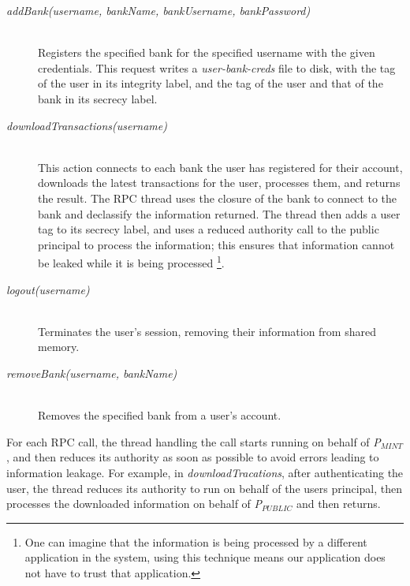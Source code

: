 \begin{description}
  \item[\emph{addBank(username, bankName, bankUsername, bankPassword)}] \ \\
    Registers the specified bank 
    for the specified username with the given 
    credentials.
    This request writes a \emph{user-bank-creds} 
    file to disk, with the tag of
    the user in its integrity label, and the 
    tag of the user and that of the bank
    in its secrecy label.
  \item[\emph{downloadTransactions(username)}] \ \\
    This action connects to each bank the 
    user has registered for their account, 
    downloads the latest transactions for the user, 
    processes them, and returns the result.
    The RPC thread uses the closure of the bank to
    connect to the bank and declassify the 
    information returned. The thread then
    adds a user tag to its secrecy label, 
    and uses a reduced authority call to 
    the public principal to process the information; 
    this ensures that information
    cannot be leaked while it is being
    processed
    \footnote{One can imagine that the 
    information is being processed by a different
    application in the system, 
    using this technique means our application 
    does not have to trust that 
    application.}. 


  \item[\emph{logout(username)}] \ \\
    Terminates the user's session, removing 
    their information from shared memory.
  \item[\emph{removeBank(username, bankName)}] \ \\
    Removes the specified bank from a user's account.

\end{description}

\noindent
For each RPC call, the thread handling the call starts running on behalf of \emph{P$_{MINT}$}, and then reduces its authority as soon as possible to avoid errors leading to information leakage. For example, in \emph{downloadTracations}, after authenticating the user, the thread reduces its authority to run on behalf of the users principal, then processes the downloaded information on behalf of \emph{P$_{PUBLIC}$} and then returns.


